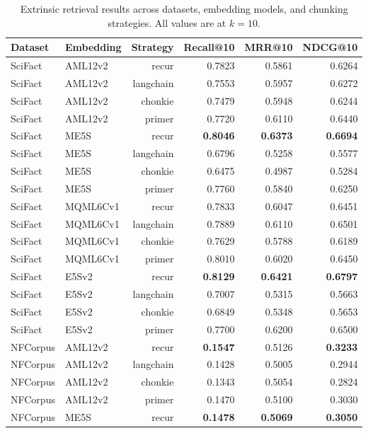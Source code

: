 \documentclass[conference]{IEEEtran}
\begin{document}
\begin{table}[!t]
\caption{Extrinsic retrieval results across datasets, embedding models, and chunking strategies. All values are at $k=10$.}
\label{tab:retrieval}
\centering
\setlength{\tabcolsep}{4pt}
\begin{tabular}{llrrrr}
\toprule
Dataset & Embedding & Strategy & Recall@10 & MRR@10 & NDCG@10 \\
\midrule
SciFact & AML12v2 & recur     & 0.7823 & 0.5861 & 0.6264 \\
SciFact & AML12v2 & langchain & 0.7553 & 0.5957 & 0.6272 \\
SciFact & AML12v2 & chonkie   & 0.7479 & 0.5948 & 0.6244 \\
SciFact & AML12v2 & primer    & 0.7720 & 0.6110 & 0.6440 \\
SciFact & ME5S    & recur     & \textbf{0.8046} & \textbf{0.6373} & \textbf{0.6694} \\
SciFact & ME5S    & langchain & 0.6796 & 0.5258 & 0.5577 \\
SciFact & ME5S    & chonkie   & 0.6475 & 0.4987 & 0.5284 \\
SciFact & ME5S    & primer    & 0.7760 & 0.5840 & 0.6250 \\
SciFact & MQML6Cv1 & recur    & 0.7833 & 0.6047 & 0.6451 \\
SciFact & MQML6Cv1 & langchain & 0.7889 & 0.6110 & 0.6501 \\
SciFact & MQML6Cv1 & chonkie  & 0.7629 & 0.5788 & 0.6189 \\
SciFact & MQML6Cv1 & primer   & 0.8010 & 0.6020 & 0.6450 \\
SciFact & E5Sv2   & recur     & \textbf{0.8129} & \textbf{0.6421} & \textbf{0.6797} \\
SciFact & E5Sv2   & langchain & 0.7007 & 0.5315 & 0.5663 \\
SciFact & E5Sv2   & chonkie   & 0.6849 & 0.5348 & 0.5653 \\
SciFact & E5Sv2   & primer    & 0.7700 & 0.6200 & 0.6500 \\
\midrule
NFCorpus & AML12v2 & recur     & \textbf{0.1547} & 0.5126 & \textbf{0.3233} \\
NFCorpus & AML12v2 & langchain & 0.1428 & 0.5005 & 0.2944 \\
NFCorpus & AML12v2 & chonkie   & 0.1343 & 0.5054 & 0.2824 \\
NFCorpus & AML12v2 & primer    & 0.1470 & 0.5100 & 0.3030 \\
NFCorpus & ME5S    & recur     & \textbf{0.1478} & \textbf{0.5069} & \textbf{0.3050} \\

\end{tabular}
\end{table}
\end{document}
